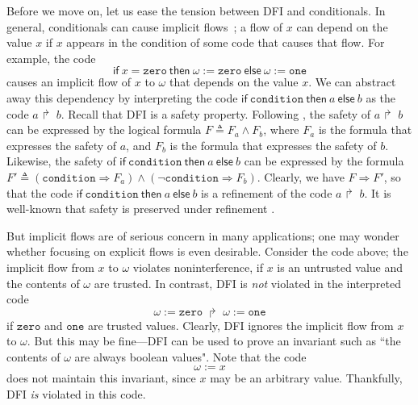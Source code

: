 \documentclass{sigplanconf}
\newcommand{\fork}[2]{#1\Rsh\:\!#2}
\begin{document}
Before we move on, let us ease the tension between DFI and conditionals. In general, conditionals can cause implicit flows~\cite{denningcert}; a flow of $x$ can depend on the value $x$ if $x$ appears in the condition of some code that causes that flow. For example, the code
$$\mathsf{if}~x = \mathtt{zero}~\mathsf{then}~\omega := \mathtt{zero}~\mathsf{else}~\omega := \mathtt{one}$$
causes an implicit flow of $x$ to $\omega$ that depends on the value $x$. We can abstract away this dependency by interpreting the code $\mathsf{if}~\mathtt{condition}~\mathsf{then}~a~\mathsf{else}~b$ as the code $\fork a b$. Recall that DFI is a safety property. Following \cite{lamport77}, the safety of $\fork a b$ can be expressed by the logical formula $F \triangleq F_a \wedge F_b$, where $F_a$ is the formula that expresses the safety of $a$, and $F_b$ is the formula that expresses the safety of $b$. Likewise, the safety of $\mathsf{if}~\mathtt{condition}~\mathsf{then}~a~\mathsf{else}~b$ can be expressed by the formula $F' \triangleq (\mathtt{condition} \Rightarrow F_a) \wedge (\neg \mathtt{condition} \Rightarrow F_b)$. Clearly, we have  $F \Rightarrow F'$, so that the code $\mathsf{if}~\mathtt{condition}~\mathsf{then}~a~\mathsf{else}~b$ is a refinement of the code $\fork a b$. It is well-known that safety is preserved under refinement \cite{lamport77}.

But implicit flows are of serious concern in many applications; one may wonder whether focusing on explicit flows is even desirable. Consider the code above; the implicit flow from $x$ to $\omega$ violates noninterference, if $x$ is an untrusted value and the contents of $\omega$ are trusted. In contrast, DFI is \emph{not} violated in the interpreted code 
$$\omega := \mathtt{zero}~\Rsh~\omega := \mathtt{one}$$
if $\mathtt{zero}$ and $\mathtt{one}$ are trusted values. Clearly, DFI ignores the implicit flow from $x$ to $\omega$. But this may be fine---DFI can be used to prove an invariant such as ``the contents of $\omega$ are always boolean values". Note that the code
$$\omega := x$$
does not maintain this invariant, since $x$ may be an arbitrary value. Thankfully, DFI \emph{is} violated in this code. 
\end{document}
